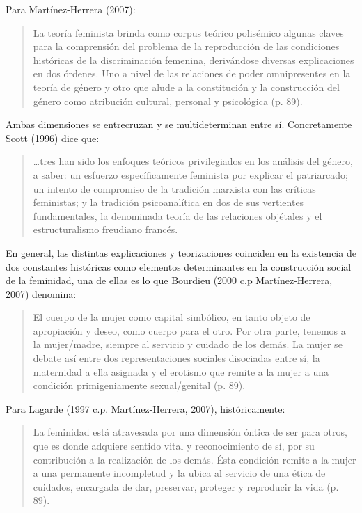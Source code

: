 Para Martínez-Herrera (2007):

\begin{quote}
    La teoría feminista brinda como corpus teórico polisémico algunas claves para
    la comprensión del problema de la reproducción de las condiciones históricas de
    la discriminación femenina, derivándose diversas explicaciones en dos órdenes.
    Uno a nivel de las relaciones de poder omnipresentes en la teoría de género y
    otro que alude a la constitución y la construcción del género como atribución
    cultural, personal y psicológica (p. 89).
\end{quote}

Ambas dimensiones se entrecruzan y se multideterminan entre sí.
Concretamente Scott (1996) dice que:

\begin{quote}
    …tres han sido los enfoques teóricos privilegiados en los análisis del
    género, a saber: un esfuerzo específicamente feminista por explicar el
    patriarcado;
    un intento de compromiso de la tradición marxista con las críticas feministas;
    y la tradición psicoanalítica en dos de sus vertientes fundamentales, la
    denominada teoría de las relaciones objétales y el estructuralismo freudiano
    francés.
\end{quote}

En general, las distintas explicaciones y teorizaciones coinciden en la
existencia de dos constantes históricas como elementos determinantes en la
construcción social de la feminidad, una de ellas es lo que Bourdieu (2000 c.p
Martínez-Herrera, 2007) denomina:

\begin{quote}
    El cuerpo de la mujer como capital simbólico, en tanto objeto de apropiación
    y deseo, como cuerpo para el otro.
    Por otra parte, tenemos a la mujer/madre, siempre al servicio y cuidado de los
    demás.
    La mujer se debate así entre dos representaciones sociales disociadas entre sí,
    la maternidad a ella asignada y el erotismo que remite a la mujer a una
    condición primigeniamente sexual/genital (p. 89).
\end{quote}

Para Lagarde (1997 c.p. Martínez-Herrera, 2007), históricamente:

\begin{quote}
    La feminidad está atravesada por una dimensión óntica de ser para otros, que es
    donde adquiere sentido vital y reconocimiento de sí, por su contribución a la
    realización de los demás.
    Ésta condición remite a la mujer a una permanente incompletud y la
    ubica al servicio de una ética de cuidados, encargada de dar,
    preservar, proteger y reproducir la vida (p. 89).
\end{quote}

